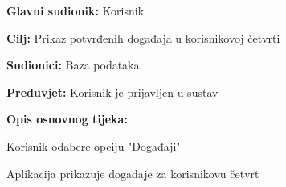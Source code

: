 					\noindent {}
					\begin{packed_item}
	
						\item \textbf{Glavni sudionik: }Korisnik
						\item  \textbf{Cilj:} Prikaz potvrđenih događaja u korisnikovoj četvrti
						\item  \textbf{Sudionici:} Baza podataka
						\item  \textbf{Preduvjet:} Korisnik je prijavljen u sustav
						\item  \textbf{Opis osnovnog tijeka:}
						
						\item[] \begin{packed_enum}
	
							\item Korisnik odabere opciju "Događaji"
							\item Aplikacija prikazuje događaje za korisnikovu četvrt
						\end{packed_enum}
						
							
						\end{packed_item}
					\noindent {}
